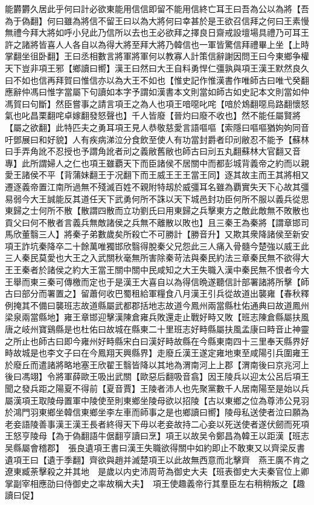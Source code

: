 能欝欝久居此乎何曰計必欲東能用信信即留不能用信終亡耳王曰吾為公以為將【吾為于偽翻】何曰雖為將信不留王曰以為大將何曰幸甚於是王欲召信拜之何曰王素慢無禮今拜大將如呼小兒此乃信所以去也王必欲拜之擇良日齋戒設壇場具禮乃可耳王許之諸將皆喜人人各自以為得大將至拜大將乃韓信也一軍皆驚信拜禮畢上坐【上時掌翻坐徂卧翻】王曰丞相數言將軍將軍何以教寡人計策信辭謝因問王曰今東鄉争權天下豈非項王邪【鄉讀曰嚮】漢王曰然曰大王自料勇悍仁彊孰與項王漢王默然良久曰不如也信再拜賀曰惟信亦以為大王不如也【惟史記作惟漢書作唯師古曰唯弋癸翻應辭仲馮曰惟字當屬下句讀如本字予謂如漢書本文則當如師古如史記本文則當如仲馮賀曰句斷】然臣嘗事之請言項王之為人也項王喑噁叱咤【喑於鴆翻噁烏路翻懷怒氣也叱昌栗翻咤卓嫁翻發怒聲也】千人皆廢【晉灼曰廢不收也】然不能任屬賢將【屬之欲翻】此特匹夫之勇耳項王見人恭敬慈愛言語嘔嘔【索隱曰嘔嘔猶姁姁同音吁鄧展曰和好貌】人有疾病涕泣分食飲至使人有功當封爵者印刓敝忍不能予【蘇林曰手弄角訛不忍授也予謂角訛者刓之義敝舊敝也師古曰刓五丸翻蘇林大官翻又音專】此所謂婦人之仁也項王雖覇天下而臣諸侯不居關中而都彭城背義帝之約而以親愛王諸侯不平【背蒲妹翻王于况翻下而王威王王王當王同】逐其故主而王其將相又遷逐義帝置江南所過無不殘滅百姓不親附特刼於威彊耳名雖為覇實失天下心故其彊易弱今大王誠能反其道任天下武勇何所不誅以天下城邑封功臣何所不服以義兵從思東歸之士何所不散【散謂四散而立功劉氏曰用東歸之兵擊東方之敵此敵無不敗散也貢父曰何不散者言義兵無敵諸侯之兵無不離散以敗也】且三秦王為秦將【謂章邯司馬欣董翳三人】將秦子弟數歲矣所殺亡不可勝計【勝音升】又欺其衆降諸侯至新安項王詐坑秦降卒二十餘萬唯獨邯欣翳得脫秦父兄怨此三人痛入骨髓今楚強以威王此三人秦民莫愛也大王之入武關秋毫無所害除秦苛法與秦民約法三章秦民無不欲得大王王秦者於諸侯之約大王當王關中關中民咸知之大王失職入漢中秦民無不恨者今大王舉而東三秦可傳檄而定也于是漢王大喜自以為得信晩遂聽信計部署諸將所擊【師古曰部分而署置之】留蕭何收巴蜀租給軍糧食八月漢王引兵從故道出襲雍【春秋釋例掩其不備曰襲班志故道縣屬武都郡括地志故道今鳳州兩當縣杜佑通典曰故道鳳州梁泉兩當縣地】雍王章邯迎擊漢陳倉雍兵敗還走止戰好畤又敗【班志陳倉縣屬扶風唐之岐州寶鷄縣是也杜佑曰故城在縣東二十里班志好畤縣屬扶風孟康曰畤音止神靈之所止也師古曰即今雍州好畤縣宋白曰漢好畤故縣在今縣東南四十三里奉天縣界好畤故城是也李文子曰在今鳳翔天興縣界】走廢丘漢王遂定雍地東至咸陽引兵圍雍王於廢丘而遣諸將略地塞王欣翟王翳皆降以其地為渭南河上上郡【渭南後曰京兆河上後曰馮翊】令將軍薛歐王吸出武關【歐惡后翻吸音翕】因王陵兵以迎太公呂后項王聞之發兵距之陽夏不得前【夏音賈】王陵者沛人也先聚黨數千人居南陽至是始以兵屬漢項王取陵母置軍中陵使至則東鄉坐陵母欲以招陵【古以東鄉之位為尊沛公見羽於鴻門羽東鄉坐韓信東鄉坐李左車而師事之是也鄉讀曰嚮】陵母私送使者泣曰願為老妾語陵善事漢王漢王長者終得天下毋以老妾故持二心妾以死送使者遂伏劒而死項王怒亨陵母【為于偽翻語牛倨翻亨讀曰烹】項王以故吴令鄭昌為韓王以距漢【班志吴縣屬會稽郡】　張良遺項王書曰漢王失職欲得關中如約即止不敢東又以齊梁反書遺項王曰【遺于季翻】齊欲與趙并滅楚項王以此故無西意而北擊齊　燕王廣不肯之遼東臧荼擊殺之并其地　是歲以内史沛周苛為御史大夫【班表御史大夫秦官位上卿掌副宰相應劭曰侍御史之率故稱大夫】　項王使趣義帝行其羣臣左右稍稍叛之【趣讀曰促】

